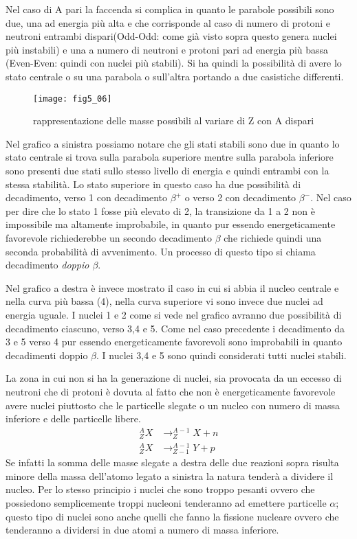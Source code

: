 Nel caso di A pari la faccenda si complica in quanto le parabole possibili sono due, una ad energia più alta e che corrisponde al caso di numero di protoni e neutroni entrambi dispari(Odd-Odd: come già visto sopra questo genera nuclei più instabili) e una a numero di neutroni e protoni pari ad energia più bassa (Even-Even:  quindi con nuclei più stabili).
Si ha quindi la possibilità di avere lo stato centrale o su una parabola o sull'altra portando a due casistiche differenti.
\begin{figure}
\centering
\texttt{[image: fig5\_06]}
\caption{rappresentazione delle masse possibili al variare di Z con A dispari}
\end{figure}

Nel grafico a sinistra possiamo notare che gli stati stabili sono due in quanto lo stato centrale si trova sulla parabola superiore mentre sulla parabola inferiore sono presenti due stati sullo stesso livello di energia e quindi entrambi con la stessa stabilità. 
Lo stato superiore in questo caso ha due possibilità di decadimento, verso 1 con decadimento $\beta^+$ o verso 2 con decadimento $\beta^-$.
Nel caso per dire che lo stato 1 fosse più elevato di 2, la transizione da 1 a 2 non è impossibile ma altamente improbabile, in quanto pur essendo energeticamente favorevole richiederebbe un secondo decadimento $\beta$ che richiede quindi una seconda probabilità di avvenimento.
Un processo di questo tipo si chiama decadimento \emph{doppio $\beta$}.

Nel grafico a destra è invece mostrato il caso in cui si abbia il nucleo centrale e nella curva più bassa (4), nella curva superiore vi sono invece due nuclei ad energia uguale.
I nuclei 1 e 2 come si vede nel grafico avranno due possibilità di decadimento ciascuno, verso 3,4 e 5.
Come nel caso precedente i decadimento da 3 e 5 verso 4 pur essendo energeticamente favorevoli sono improbabili in quanto decadimenti doppio $\beta$. 
I nuclei 3,4 e 5 sono quindi considerati tutti nuclei stabili.

La zona in cui non si ha la generazione di nuclei, sia provocata da un eccesso di neutroni che di protoni è dovuta al fatto che non è energeticamente favorevole avere nuclei piuttosto che le particelle slegate o un nucleo con numero di massa inferiore e delle particelle libere. 
\begin{equation}
\begin{split}
^A_ZX &\longrightarrow ^{A-1}_ZX+n\\
^A_ZX &\longrightarrow ^{A-1}_{Z-1}Y+p
\end{split}
\end{equation}
Se infatti la somma delle masse slegate a destra delle due reazioni sopra risulta minore della massa dell'atomo legato a sinistra la natura tenderà a dividere il nucleo.
Per lo stesso principio i nuclei che sono troppo pesanti ovvero che possiedono semplicemente troppi nucleoni tenderanno ad emettere particelle $\alpha$; questo tipo di nuclei sono anche quelli che fanno la fissione nucleare ovvero che tenderanno a dividersi in due atomi a numero di massa inferiore.

